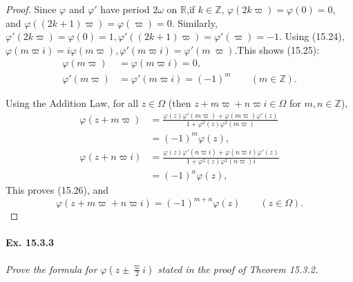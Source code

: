 \documentclass[11pt,a4paper]{article}
\newcommand{\Z}{\mathbb{Z}}
\newcommand{\R}{\mathbb{R}}
\begin{document}
\begin{proof}
Since $\varphi$ and $\varphi'$ have period $2 \omega$ on $\R$,if $k \in \Z$, $\varphi(2k \varpi) = \varphi(0) = 0$, and $\varphi((2k + 1)\varpi) = \varphi(\varpi) = 0$. Similarly, $\varphi'(2k \varpi) = \varphi(0) = 1, \varphi'((2k+1) \varpi) = \varphi'(\varpi) = -1$. Using (15.24), $\varphi(m\varpi i) = i \varphi(m \varpi), \varphi'(m \varpi i) = \varphi'(m\ \varpi)$.This shows (15.25):
\begin{align*}
\varphi(m \varpi) &=\varphi( m \varpi i) =  0,\\
\varphi'(m \varpi) &= \varphi'(m \varpi i) =  (-1)^m \qquad (m \in \Z).
\end{align*}

Using the Addition Law, for all $z \in \Omega$ (then $ z + m\varpi + n \varpi i \in \Omega$ for $m,n \in \Z$),
\begin{align*}
\varphi(z + m \varpi) &= \frac{\varphi(z) \varphi'(m\varpi) + \varphi(m \varpi) \varphi'(z)}{1 + \varphi^2(z) \varphi^2(m \varpi)}\\
&=(-1)^m \varphi(z),\\
\varphi(z + n \varpi i) &= \frac{\varphi(z) \varphi'(n\varpi i) + \varphi(n \varpi i) \varphi'(z)}{1 + \varphi^2(z) \varphi^2(n \varpi) i}\\
&=(-1)^n \varphi(z),
\end{align*}
This proves (15.26), and
$$\varphi(z + m \varpi + n \varpi i) =  (-1)^{m+n} \varphi(z)\qquad (z \in \Omega).$$
\end{proof}

\paragraph{Ex. 15.3.3}{\it Prove the formula for $\varphi\left(z \pm \frac{\varpi}{2} i\right)$ stated in the proof of Theorem 15.3.2. 
}
\end{document}

